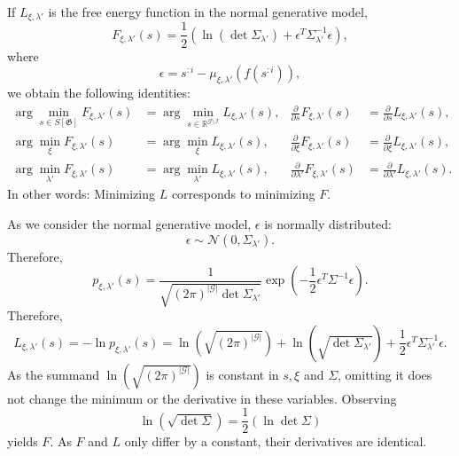 \documentclass[a4paper,11pt]{report}
\begin{document}
\begin{Pro}\label{pro:free-energy-normal}
If $L_{\xi,\lambda'}$ is the free energy function in the normal generative model,
\begin{equation}
F_{\xi,\lambda'}(s)=
\frac12\left(\ln\left(\det\Sigma_{\lambda'}\right)+\epsilon^{T}\Sigma_{\lambda'}^{-1}\epsilon\right),
\end{equation}
where
\[
\epsilon=s^{:i}-\mu_{\xi,\lambda'}\left(f(s^{:i})\right), 
\]
we obtain the following identities:
\begin{align}
\arg\min_{s\in S[\mathfrak{G}]}F_{\xi,\lambda'}(s)&=\arg\min_{s\in\mathbb{R}^{\mathcal{G}\setminus\mathcal{I}}}L_{\xi,\lambda'}(s),&
\frac{\partial}{\partial s}F_{\xi,\lambda'}(s)&=\frac{\partial}{\partial s}L_{\xi,\lambda'}(s),\\
\arg\min_{\xi}F_{\xi,\lambda'}(s)&=\arg\min_{\xi}L_{\xi,\lambda'}(s),&
\frac{\partial}{\partial \xi}F_{\xi,\lambda'}(s)&=\frac{\partial}{\partial \xi}L_{\xi,\lambda'}(s),\\
\arg\min_{\lambda'}F_{\xi,\lambda'}(s)&=\arg\min_{\lambda'}L_{\xi,\lambda'}(s),&
\frac{\partial}{\partial \lambda'}F_{\xi,\lambda'}(s)&=\frac{\partial}{\partial \lambda'}L_{\xi,\lambda'}(s).
\end{align}
In other words: Minimizing $L$ corresponds to minimizing $F$.
\end{Pro}

\begin{Bew}
As we consider the normal generative model, $\epsilon$ is normally distributed:
\[
\epsilon\sim\mathcal{N}(0,\Sigma_{\lambda'}).
\]
Therefore, 
\[
p_{\xi,\lambda'}(s)=\frac{1}{\sqrt{(2\pi)^{|\mathcal{G}|}\det\Sigma_{\lambda'}}}\exp\left(-\frac12\epsilon^T\Sigma^{-1}\epsilon\right).
\]
Therefore, 
\[
L_{\xi,\lambda'}(s)=-\ln p_{\xi,\lambda'}(s)=\ln\left(\sqrt{(2\pi)^{|\mathcal{G}|}}\right)+\ln\left(\sqrt{\det\Sigma_{\lambda'}}\right)+\frac12\epsilon^T\Sigma_{\lambda'}^{-1}\epsilon.
\]
As the summand $\ln\left(\sqrt{(2\pi)^{|\mathcal{G}|}}\right)$ is constant in $s,\xi$ and $\Sigma$, omitting it does not change the minimum or the derivative in these variables. Observing
\[
\ln\left(\sqrt{\det\Sigma}\right)=\frac12\left(\ln\det\Sigma\right)
\]
yields $F$. As $F$ and $L$ only differ by a constant, their derivatives are identical.
\end{Bew}
\end{document}
